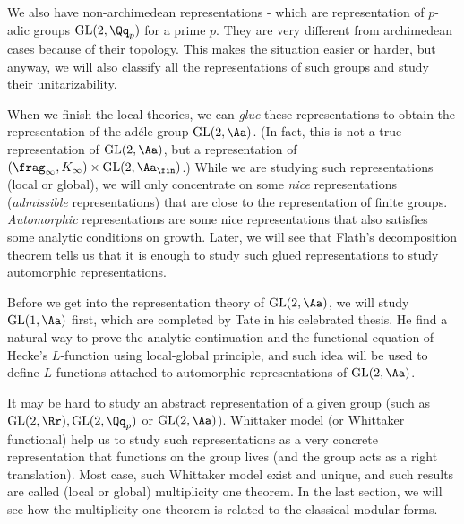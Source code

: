 \documentclass{article}
\newcommand{\GL}{\mathrm{GL}}
\begin{document}
We also have non-archimedean representations - which are representation of $p$-adic groups $\GL(2, \Qq_{p})$ for a prime $p$. They are very different from archimedean cases because of their topology. This makes the situation easier or harder, but anyway, we will also classify all the representations of such groups and study their unitarizability. 

When we finish the local theories, we can \emph{glue} these representations to obtain the representation of the ad\'ele group $\GL(2, \Aa)$. (In fact, this is not a true representation of $\GL(2, \Aa)$, but a representation of $(\frag_{\infty}, K_{\infty}) \times \GL(2, \Aa_{\fin})$.) 
While we are studying such representations (local or global), we will only concentrate on some \emph{nice} representations (\emph{admissible} representations) that are close to the representation of finite groups. 
\emph{Automorphic} representations are some nice representations that also satisfies some analytic conditions on growth. 
Later, we will see that Flath's decomposition theorem tells us that it is enough to study such glued representations to study automorphic representations. 

Before we get into the representation theory of $\GL(2, \Aa)$, we will study $\GL(1, \Aa)$ first, which are  completed by Tate in his celebrated thesis. He find a natural way to prove the analytic continuation and the functional equation of Hecke's $L$-function using local-global principle, and such idea will be used to define $L$-functions attached to automorphic representations of $\GL(2,\Aa)$. 

It may be hard to study an abstract representation of a given group (such as $\GL(2, \Rr), \GL(2, \Qq_{p})$ or $\GL(2, \Aa)$). 
Whittaker model (or Whittaker functional) help us to study such representations as a very concrete representation that functions on the group lives (and the group acts as a right translation). 
Most case, such Whittaker model exist and unique, and such results are called (local or global) multiplicity one theorem. 
In the last section, we will see how the multiplicity one theorem is related to the classical modular forms. 


\newpage
\end{document}
